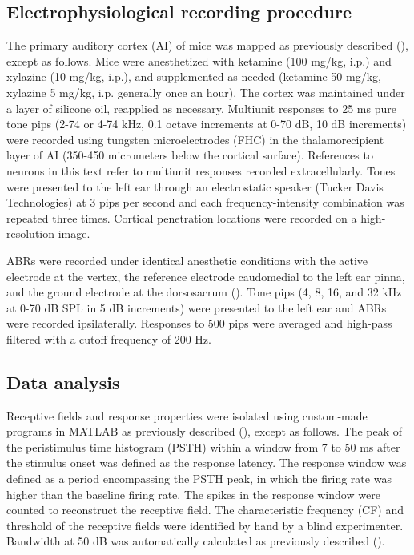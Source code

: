 \subsection{Electrophysiological recording procedure}

The primary auditory cortex (AI) of mice was mapped as previously described (\cite{Kim2009}), except as follows. Mice were anesthetized with ketamine (100 mg/kg, i.p.) and xylazine (10 mg/kg, i.p.), and supplemented as needed (ketamine 50 mg/kg, xylazine 5 mg/kg, i.p. generally once an hour). The cortex was maintained under a layer of silicone oil, reapplied as necessary. Multiunit responses to 25 ms pure tone pips (2-74 or 4-74 kHz, 0.1 octave increments at 0-70 dB, 10 dB increments) were recorded using tungsten microelectrodes (FHC) in the thalamorecipient layer of AI (350-450 micrometers below the cortical surface). References to neurons in this text refer to multiunit responses recorded extracellularly. Tones were presented to the left ear through an electrostatic speaker (Tucker Davis Technologies) at 3 pips per second and each frequency-intensity combination was repeated three times. Cortical penetration locations were recorded on a high-resolution image.

ABRs were recorded under identical anesthetic conditions with the active electrode at the vertex, the reference electrode caudomedial to the left ear pinna, and the ground electrode at the dorsosacrum (\cite{OConnor1998, Popescu2010}). Tone pips (4, 8, 16, and 32 kHz at 0-70 dB SPL in 5 dB increments) were presented to the left ear and ABRs were recorded ipsilaterally. Responses to 500 pips were averaged and high-pass filtered with a cutoff frequency of 200 Hz.

\subsection{Data analysis}

Receptive fields and response properties were isolated using custom-made programs in MATLAB as previously described (\cite{Insanally2010}), except as follows. The peak of the peristimulus time histogram (PSTH) within a window from 7 to 50 ms after the stimulus onset was defined as the response latency. The response window was defined as a period encompassing the PSTH peak, in which the firing rate was higher than the baseline firing rate. The spikes in the response window were counted to reconstruct the receptive field. The characteristic frequency (CF) and threshold of the receptive fields were identified by hand by a blind experimenter. Bandwidth at 50 dB was automatically calculated as previously described (\cite{Insanally2010}).

